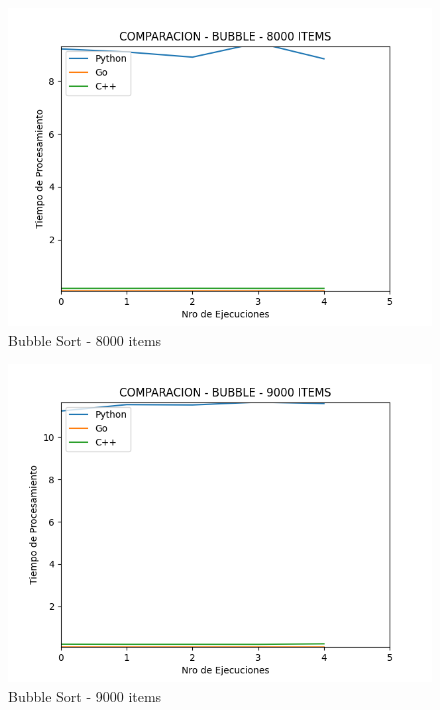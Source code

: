 \documentclass[12pt]{article} %
\begin{document}
    \begin{figure}[H]
    \centering
    \includegraphics[width=\textwidth]{bubble_8000}
    \caption{Bubble Sort - 8000 items}
    \end{figure}

    \vspace{5mm}
    
    \begin{figure}[H]
    \centering
    \includegraphics[width=\textwidth]{bubble_9000}
    \caption{Bubble Sort - 9000 items}
    \end{figure}

    \vspace{5mm}
    
\end{document}
